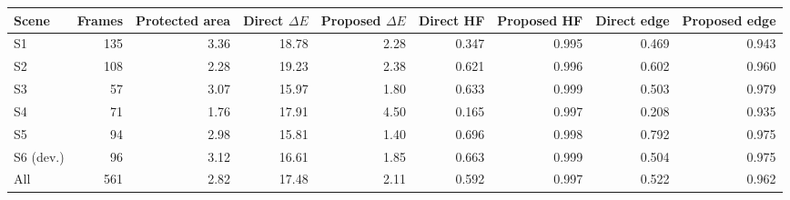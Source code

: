 \begin{tabular}{lrrrrrrrr}
\toprule
Scene & Frames & Protected area & Direct $\Delta E$ & Proposed $\Delta E$ & Direct HF & Proposed HF & Direct edge & Proposed edge \\
\midrule
S1 & 135 & 3.36 & 18.78 & 2.28 & 0.347 & 0.995 & 0.469 & 0.943 \\
S2 & 108 & 2.28 & 19.23 & 2.38 & 0.621 & 0.996 & 0.602 & 0.960 \\
S3 & 57 & 3.07 & 15.97 & 1.80 & 0.633 & 0.999 & 0.503 & 0.979 \\
S4 & 71 & 1.76 & 17.91 & 4.50 & 0.165 & 0.997 & 0.208 & 0.935 \\
S5 & 94 & 2.98 & 15.81 & 1.40 & 0.696 & 0.998 & 0.792 & 0.975 \\
S6 (dev.) & 96 & 3.12 & 16.61 & 1.85 & 0.663 & 0.999 & 0.504 & 0.975 \\
All & 561 & 2.82 & 17.48 & 2.11 & 0.592 & 0.997 & 0.522 & 0.962 \\
\bottomrule
\end{tabular}

